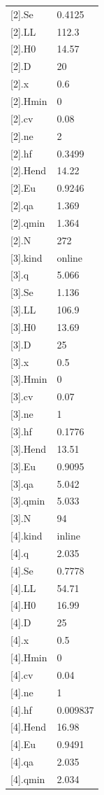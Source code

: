 {\begin{longtable}{p{}p{}}
{}[2].Se & 0.4125\\
{}[2].LL & 112.3\\
{}[2].H0 & 14.57\\
{}[2].D & 20\\
{}[2].x & 0.6\\
{}[2].Hmin & 0\\
{}[2].cv & 0.08\\
{}[2].ne & 2\\
{}[2].hf & 0.3499\\
{}[2].Hend & 14.22\\
{}[2].Eu & 0.9246\\
{}[2].qa & 1.369\\
{}[2].qmin & 1.364\\
{}[2].N & 272\\
{}[3].kind & online\\
{}[3].q & 5.066\\
{}[3].Se & 1.136\\
{}[3].LL & 106.9\\
{}[3].H0 & 13.69\\
{}[3].D & 25\\
{}[3].x & 0.5\\
{}[3].Hmin & 0\\
{}[3].cv & 0.07\\
{}[3].ne & 1\\
{}[3].hf & 0.1776\\
{}[3].Hend & 13.51\\
{}[3].Eu & 0.9095\\
{}[3].qa & 5.042\\
{}[3].qmin & 5.033\\
{}[3].N & 94\\
{}[4].kind & inline\\
{}[4].q & 2.035\\
{}[4].Se & 0.7778\\
{}[4].LL & 54.71\\
{}[4].H0 & 16.99\\
{}[4].D & 25\\
{}[4].x & 0.5\\
{}[4].Hmin & 0\\
{}[4].cv & 0.04\\
{}[4].ne & 1\\
{}[4].hf & 0.009837\\
{}[4].Hend & 16.98\\
{}[4].Eu & 0.9491\\
{}[4].qa & 2.035\\
{}[4].qmin & 2.034\\

\end{longtable}}
